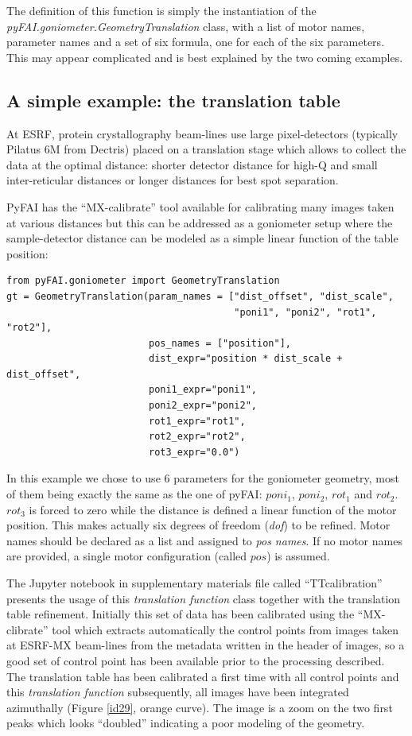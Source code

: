 \documentclass[preprint, pdf]{iucr}              %
\begin{document}
The definition of this function is simply the instantiation of the
\textit{pyFAI.goniometer.GeometryTranslation} class, with a list of motor
names, parameter names and a set of six formula, one for each of the six parameters. 
This may appear complicated and is best explained by the two coming examples.

\subsection{A simple example: the translation table}

At ESRF, protein crystallography beam-lines use large pixel-detectors (typically
Pilatus 6M from Dectris) placed on a translation stage which allows to collect
the data at the optimal distance: shorter detector distance for high-Q and small
inter-reticular distances or longer distances for best spot separation.

PyFAI has the ``MX-calibrate'' tool available for calibrating many images taken
at various distances but this can be addressed as a goniometer setup where the
sample-detector distance can be modeled as a simple linear function of the table
position:

\begin{verbatim}
from pyFAI.goniometer import GeometryTranslation
gt = GeometryTranslation(param_names = ["dist_offset", "dist_scale", 
                                        "poni1", "poni2", "rot1", "rot2"],
                         pos_names = ["position"],
                         dist_expr="position * dist_scale + dist_offset", 
                         poni1_expr="poni1",
                         poni2_expr="poni2", 
                         rot1_expr="rot1", 
                         rot2_expr="rot2", 
                         rot3_expr="0.0")
\end{verbatim}
 
In this example we chose to use 6 parameters for the goniometer
geometry, most of them being exactly the same as the one of pyFAI: 
$poni_1$, $poni_2$, $rot_1$
and $rot_2$. 
$rot_3$ is forced to zero while the distance is defined a
linear function of the motor position. 
This makes actually six degrees of freedom  (\textit{dof}) to be refined.
Motor names should be declared as a list and assigned to \textit{pos names}. 
If no motor names are provided, a single motor  configuration (called $pos$)
is assumed.

The Jupyter notebook \cite{ipython} in supplementary materials file called
``TTcalibration'' presents the usage of this \textit{translation function} class
together with the translation table refinement. 
Initially this set of data has been calibrated using the ``MX-clibrate'' tool
which extracts automatically the control points from images taken at ESRF-MX
beam-lines from the metadata written in the header of images, so a good set
of control point has been available prior to the processing described. 
The translation table has been calibrated a first time with all control points
and this \textit{translation function} subsequently, all images have been
integrated azimuthally (Figure \ref{id29}, orange curve). 
The image is a zoom on the two first peaks which looks ``doubled'' indicating a
poor modeling of the geometry.
\end{document}
